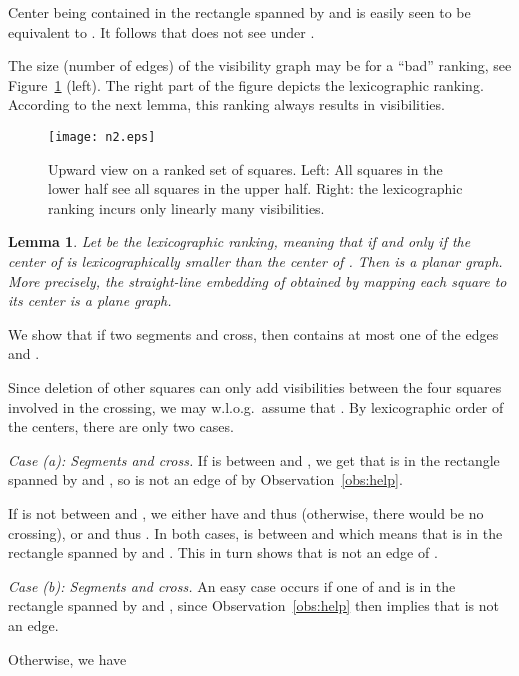 \documentclass[fleqn,11pt]{article}
\newtheorem{lemma}[definition]{Lemma}
\newcommand{\proof}{\noindent{\bf Proof.} \hspace{1mm}}
\newcommand{\qed}{\hfill\usebox{\proofsymbol}}
\begin{document}
\proof 
Center  being contained in the rectangle spanned by 
and  is easily seen to be equivalent to .
It follows that  does not see  under .  
\qed

The size (number of edges) of the visibility graph may be
 for a ``bad'' ranking, see Figure~\ref{fig:n2} (left).
The right part of the figure depicts the lexicographic ranking.
According to the next lemma, this ranking always results in 
visibilities.

\begin{figure}[htb]
\begin{center}
\texttt{[image: n2.eps]}
\end{center}
\caption{Upward view on a ranked set of squares. Left: All squares in the 
lower half see all squares in the
upper half. Right: the lexicographic ranking incurs only linearly many 
visibilities.\label{fig:n2}}
\end{figure}

\begin{lemma}\label{lem:main}
  Let  be the lexicographic ranking,
  meaning that  if and only if the center of  is
  lexicographically smaller than the center of . Then 
  is a planar graph. More precisely, the straight-line embedding of
   obtained by mapping each square  to its center
   is a plane graph.
\end{lemma}

\proof We show that if two segments  and
 cross, then  contains at most
one of the edges  and . 

Since deletion of other squares can only add visibilities between the
four squares involved in the crossing, we may w.l.o.g.\
assume that . By 
lexicographic order of the centers, there are only two
cases.\smallskip

\emph{Case (a): Segments  and 
  cross.} If  is between  and , we get that
 is in the rectangle spanned by  and , so
 is not an edge of  by 
Observation~\ref{obs:help}.


If  is not between  and , we either have
 and thus  (otherwise, there
would be no crossing), or  and thus . In both cases,  is between  and  which
means that  is in the rectangle spanned by  and . This
in turn shows that  is not an edge of .
\smallskip

\emph{Case (b): Segments  and 
  cross.} An easy case occurs if one of
 and  is in the rectangle spanned by  and
, since Observation~\ref{obs:help} then implies that
 is not an edge.

Otherwise, we have 
\end{document}
